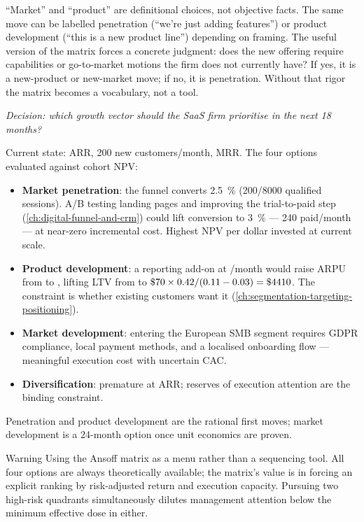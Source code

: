 ``Market'' and ``product'' are definitional choices, not objective facts. The same move can
be labelled penetration (``we're just adding features'') or product development (``this is
a new product line'') depending on framing. The useful version of the matrix forces a
concrete judgment: does the new offering require capabilities or go-to-market motions the
firm does not currently have? If yes, it is a new-product or new-market move; if no, it is
penetration. Without that rigor the matrix becomes a vocabulary, not a tool.

\begin{example}
\emph{Decision: which growth vector should the SaaS firm prioritise in the next 18 months?}

Current state:  ARR, \num{200} new customers/month,  MRR.
The four options evaluated against cohort NPV:

\begin{itemize}
  \item \textbf{Market penetration}: the funnel converts \qty{2.5}{\percent}
        (200/8000 qualified sessions). A/B testing landing pages and improving the
        trial-to-paid step (\cref{ch:digital-funnel-and-crm}) could lift conversion to
        \qty{3}{\percent} --- 240 paid/month --- at near-zero incremental cost.
        Highest NPV per dollar invested at current scale.
  \item \textbf{Product development}: a reporting add-on at /month would raise
        ARPU from  to , lifting LTV from  to
        \(\$\num{70}\times 0.42/(0.11-0.03) = \$\num{4410}\). The constraint is
        whether existing customers want it (\cref{ch:segmentation-targeting-positioning}).
  \item \textbf{Market development}: entering the European SMB segment requires GDPR
        compliance, local payment methods, and a localised onboarding flow ---
        meaningful execution cost with uncertain CAC.
  \item \textbf{Diversification}: premature at  ARR; reserves of
        execution attention are the binding constraint.
\end{itemize}

Penetration and product development are the rational first moves; market development
is a 24-month option once unit economics are proven.
\end{example}

\begin{admonition}{Warning}
Using the Ansoff matrix as a menu rather than a sequencing tool. All four options are
always theoretically available; the matrix's value is in forcing an explicit ranking by
risk-adjusted return and execution capacity. Pursuing two high-risk quadrants simultaneously
dilutes management attention below the minimum effective dose in either.
\end{admonition}

